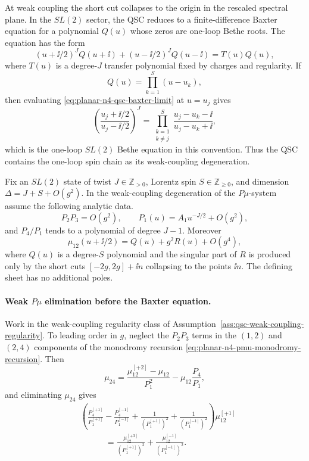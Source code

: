 At weak coupling the short cut collapses to the origin in the rescaled
spectral plane.  In the \(SL(2)\) sector, the QSC reduces to a finite-difference
Baxter equation for a polynomial \(Q(u)\) whose zeros are one-loop Bethe roots.
The equation has the form
\begin{equation}
  (u+\ii/2)^JQ(u+\ii)
  +(u-\ii/2)^JQ(u-\ii)
  =
  T(u)Q(u),
  \label{eq:planar-n4-qsc-baxter-limit}
\end{equation}
where \(T(u)\) is a degree-\(J\) transfer polynomial fixed by charges and
regularity.  If
\[
  Q(u)=\prod_{k=1}^S(u-u_k),
\]
then evaluating \eqref{eq:planar-n4-qsc-baxter-limit} at \(u=u_j\) gives
\[
  \left(\frac{u_j+\ii/2}{u_j-\ii/2}\right)^J
  =
  \prod_{\substack{k=1\\k\neq j}}^S
  \frac{u_j-u_k-\ii}{u_j-u_k+\ii},
\]
which is the one-loop \(SL(2)\) Bethe equation in this convention.  Thus the
QSC contains the one-loop spin chain as its weak-coupling degeneration.

\begin{assumption}
\label{ass:qsc-weak-coupling-regularity}
Fix an \(SL(2)\) state of twist \(J\in\mathbb Z_{>0}\), Lorentz spin
\(S\in\mathbb Z_{\geq0}\), and dimension
\(\Delta=J+S+O(g^2)\).  In the weak-coupling degeneration of the
\(P\mu\)-system assume the following analytic data.
\[
  P_2P_3=O(g^2),\qquad
  P_1(u)=A_1u^{-J/2}+O(g^2),
\]
and \(P_4/P_1\) tends to a polynomial of degree \(J-1\).  Moreover
\[
  \mu_{12}(u+\ii/2)=Q(u)+g^2R(u)+O(g^4),
\]
where \(Q(u)\) is a degree-\(S\) polynomial and the singular part of \(R\) is
produced only by the short cuts \([-2g,2g]+\ii n\) collapsing to the points
\(\ii n\).  The defining sheet has no additional poles.
\end{assumption}

\paragraph{Weak \(P\mu\) elimination before the Baxter equation.}
Work in the weak-coupling regularity class of
Assumption~\ref{ass:qsc-weak-coupling-regularity}.  To leading order in
\(g\), neglect the \(P_2P_3\) terms in the \((1,2)\) and \((2,4)\)
components of the monodromy recursion
\eqref{eq:planar-n4-pmu-monodromy-recursion}.  Then
\begin{equation}
  \mu_{24}
  =
  \frac{\mu_{12}^{[+2]}-\mu_{12}}{P_1^2}
  -
  \mu_{12}\frac{P_4}{P_1},
  \label{eq:qsc-weak-mu24-from-mu12}
\end{equation}
and eliminating \(\mu_{24}\) gives
\begin{equation}
\begin{aligned}
  &\left(
    \frac{P_4^{[+1]}}{P_1^{[+1]}}
    -
    \frac{P_4^{[-1]}}{P_1^{[-1]}}
    +
    \frac{1}{(P_1^{[+1]})^2}
    +
    \frac{1}{(P_1^{[-1]})^2}
  \right)\mu_{12}^{[+1]}  \\
  &\hspace{3em}
  =
  \frac{\mu_{12}^{[+3]}}{(P_1^{[+1]})^2}
  +
  \frac{\mu_{12}^{[-1]}}{(P_1^{[-1]})^2}.
\end{aligned}
  \label{eq:qsc-weak-mu12-pre-baxter}
\end{equation}

